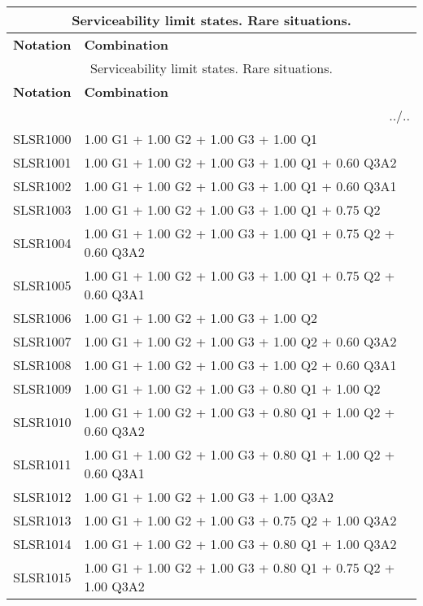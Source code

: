 \begin{center}
\begin{small}
\begin{longtable}{|l|p{10cm}|}
\hline
\multicolumn{2}{|c|}{Serviceability limit states. Rare situations.}\\
\hline
\textbf{Notation} & \textbf{Combination} \\
\hline
\endfirsthead
\hline
\multicolumn{2}{|c|}{Serviceability limit states. Rare situations.}\\
\hline
\textbf{Notation} & \textbf{Combination} \\
\hline
\endhead
\hline \multicolumn{2}{|r|}{{../..}} \\ \hline
\endfoot
\hline
\endlastfoot
SLSR1000 & 1.00 G1 + 1.00 G2 + 1.00 G3 + 1.00 Q1\\
SLSR1001 & 1.00 G1 + 1.00 G2 + 1.00 G3 + 1.00 Q1 + 0.60 Q3A2\\
SLSR1002 & 1.00 G1 + 1.00 G2 + 1.00 G3 + 1.00 Q1 + 0.60 Q3A1\\
SLSR1003 & 1.00 G1 + 1.00 G2 + 1.00 G3 + 1.00 Q1 + 0.75 Q2\\
SLSR1004 & 1.00 G1 + 1.00 G2 + 1.00 G3 + 1.00 Q1 + 0.75 Q2 + 0.60 Q3A2\\
SLSR1005 & 1.00 G1 + 1.00 G2 + 1.00 G3 + 1.00 Q1 + 0.75 Q2 + 0.60 Q3A1\\
SLSR1006 & 1.00 G1 + 1.00 G2 + 1.00 G3 + 1.00 Q2\\
SLSR1007 & 1.00 G1 + 1.00 G2 + 1.00 G3 + 1.00 Q2 + 0.60 Q3A2\\
SLSR1008 & 1.00 G1 + 1.00 G2 + 1.00 G3 + 1.00 Q2 + 0.60 Q3A1\\
SLSR1009 & 1.00 G1 + 1.00 G2 + 1.00 G3 + 0.80 Q1 + 1.00 Q2\\
SLSR1010 & 1.00 G1 + 1.00 G2 + 1.00 G3 + 0.80 Q1 + 1.00 Q2 + 0.60 Q3A2\\
SLSR1011 & 1.00 G1 + 1.00 G2 + 1.00 G3 + 0.80 Q1 + 1.00 Q2 + 0.60 Q3A1\\
SLSR1012 & 1.00 G1 + 1.00 G2 + 1.00 G3 + 1.00 Q3A2\\
SLSR1013 & 1.00 G1 + 1.00 G2 + 1.00 G3 + 0.75 Q2 + 1.00 Q3A2\\
SLSR1014 & 1.00 G1 + 1.00 G2 + 1.00 G3 + 0.80 Q1 + 1.00 Q3A2\\
SLSR1015 & 1.00 G1 + 1.00 G2 + 1.00 G3 + 0.80 Q1 + 0.75 Q2 + 1.00 Q3A2\\
\hline
\end{longtable}
\end{small}
\end{center}
